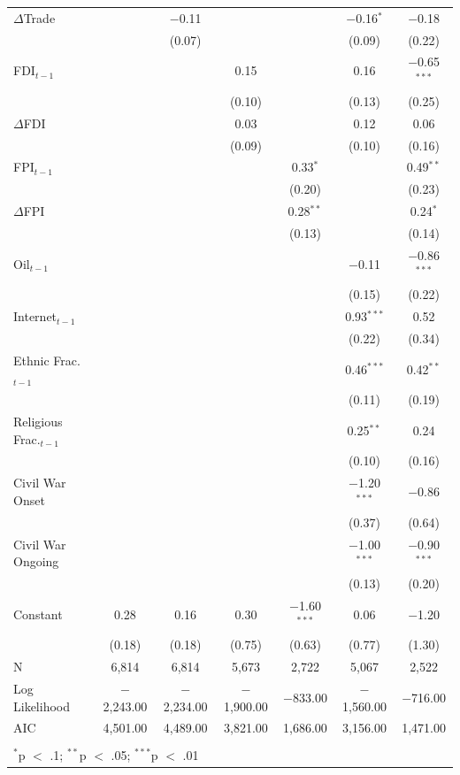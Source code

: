 \documentclass[12pt,a4paper]{article}\usepackage[]{graphicx}\usepackage[]{color}
\begin{document}
{\begin{table}[!htbp]
\begin{tabular}{@{\extracolsep{5pt}}lcccccc}
  $\Delta$Trade &  & $-$0.11 &  &  & $-$0.16$^{*}$ & $-$0.18 \\ 
  &  & (0.07) &  &  & (0.09) & (0.22) \\ 
  FDI$_{t-1}$ &  &  & 0.15 &  & 0.16 & $-$0.65$^{***}$ \\ 
  &  &  & (0.10) &  & (0.13) & (0.25) \\ 
  $\Delta$FDI &  &  & 0.03 &  & 0.12 & 0.06 \\ 
  &  &  & (0.09) &  & (0.10) & (0.16) \\ 
  FPI$_{t-1}$ &  &  &  & 0.33$^{*}$ &  & 0.49$^{**}$ \\ 
  &  &  &  & (0.20) &  & (0.23) \\ 
  $\Delta$FPI &  &  &  & 0.28$^{**}$ &  & 0.24$^{*}$ \\ 
  &  &  &  & (0.13) &  & (0.14) \\ 
  Oil$_{t-1}$ &  &  &  &  & $-$0.11 & $-$0.86$^{***}$ \\ 
  &  &  &  &  & (0.15) & (0.22) \\ 
  Internet$_{t-1}$ &  &  &  &  & 0.93$^{***}$ & 0.52 \\ 
  &  &  &  &  & (0.22) & (0.34) \\ 
  Ethnic Frac.$_{t-1}$ &  &  &  &  & 0.46$^{***}$ & 0.42$^{**}$ \\ 
  &  &  &  &  & (0.11) & (0.19) \\ 
  Religious Frac.$_{t-1}$ &  &  &  &  & 0.25$^{**}$ & 0.24 \\ 
  &  &  &  &  & (0.10) & (0.16) \\ 
  Civil War Onset &  &  &  &  & $-$1.20$^{***}$ & $-$0.86 \\ 
  &  &  &  &  & (0.37) & (0.64) \\ 
  Civil War Ongoing &  &  &  &  & $-$1.00$^{***}$ & $-$0.90$^{***}$ \\ 
  &  &  &  &  & (0.13) & (0.20) \\ 
  Constant & 0.28 & 0.16 & 0.30 & $-$1.60$^{***}$ & 0.06 & $-$1.20 \\ 
  & (0.18) & (0.18) & (0.75) & (0.63) & (0.77) & (1.30) \\ 
 N & 6,814 & 6,814 & 5,673 & 2,722 & 5,067 & 2,522 \\ 
Log Likelihood & $-$2,243.00 & $-$2,234.00 & $-$1,900.00 & $-$833.00 & $-$1,560.00 & $-$716.00 \\ 
AIC & 4,501.00 & 4,489.00 & 3,821.00 & 1,686.00 & 3,156.00 & 1,471.00 \\ 
\hline \\[-1.8ex] 
\multicolumn{7}{l}{$^{*}$p $<$ .1; $^{**}$p $<$ .05; $^{***}$p $<$ .01} \\ 
\end{tabular} 
\end{table} 

\clearpage
}
\end{document}
